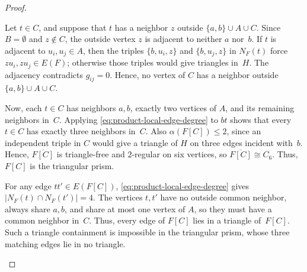 \documentclass[a4paper]{article}
\theoremstyle{plain}
\theoremstyle{definition}
\numberwithin{equation}{section}
\begin{document}
\begin{proof}
\begin{itemize}
Let $t\in C$, and suppose that $t$ has a neighbor $z$ outside $\{a,b\}\cup A\cup C$.
Since $B=\emptyset$ and $z\notin C$, the outside vertex $z$ is adjacent to neither $a$ nor~$b$.
If $t$ is adjacent to $u_i,u_j\in A$, then the triples $\{b,u_i,z\}$ and $\{b,u_j,z\}$ in $N_F(t)$ force $zu_i,zu_j\in E(F)$; otherwise those triples would give triangles in~$H$.
The adjacency contradicts $g_{ij}=0$.
Hence, no vertex of $C$ has a neighbor outside $\{a,b\}\cup A\cup C$.

Now, each $t\in C$ has neighbors $a,b$, exactly two vertices of $A$, and its remaining neighbors in~$C$.
Applying \eqref{eq:product-local-edge-degree} to $bt$ shows that every $t\in C$ has exactly three neighbors in~$C$.
Also $\alpha(F[C])\le 2$, since an independent triple in $C$ would give a triangle of $H$ on three edges incident with~$b$.
Hence, $\overline{F[C]}$ is triangle-free and $2$-regular on six vertices, so $\overline{F[C]}\cong C_6$.
Thus, $F[C]$ is the triangular prism.

For any edge $tt'\in E(F[C])$, \eqref{eq:product-local-edge-degree} gives $|N_F(t)\cap N_F(t')|=4$.
The vertices $t,t'$ have no outside common neighbor, always share $a,b$, and share at most one vertex of $A$, so they must have a common neighbor in~$C$.
Thus, every edge of $F[C]$ lies in a triangle of~$F[C]$.
Such a triangle containment is impossible in the triangular prism, whose three matching edges lie in no triangle.


\end{itemize}
\end{proof}
\end{document}
